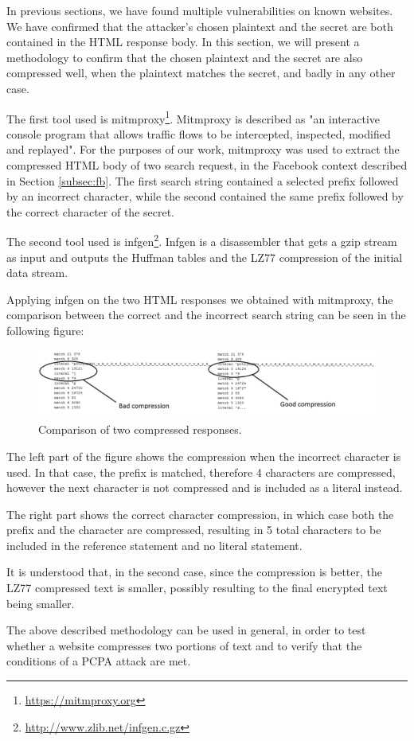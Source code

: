 In previous sections, we have found multiple vulnerabilities on known websites.
We have confirmed that the attacker's chosen plaintext and the secret are both
contained in the HTML response body. In this section, we will present a
methodology to confirm that the chosen plaintext and the secret are also
compressed well, when the plaintext matches the secret, and badly in any other
case.

The first tool used is mitmproxy\footnote{\url{https://mitmproxy.org}}.
Mitmproxy is described as "an interactive console program that allows traffic
flows to be intercepted, inspected, modified and replayed". For the purposes of
our work, mitmproxy was used to extract the compressed HTML body of two search
request, in the Facebook context described in Section \ref{subsec:fb}. The first
search string contained a selected prefix followed by an incorrect character,
while the second contained the same prefix followed by the correct character of
the secret.

The second tool used is infgen\footnote{\url{http://www.zlib.net/infgen.c.gz}}.
Infgen is a disassembler that gets a gzip stream as input and outputs the
Huffman tables and the LZ77 compression of the initial data stream.

Applying infgen on the two HTML responses we obtained with mitmproxy, the
comparison between the correct and the incorrect search string can be seen in
the following figure:

\begin{figure}[H] \caption{Comparison of two compressed responses.}
\includegraphics[width=1.15\textwidth]{diagrams/compression_comparison.png}\end{figure}

The left part of the figure shows the compression when the incorrect character
is used. In that case, the prefix is matched, therefore 4 characters are
compressed, however the next character is not compressed and is included as a
literal instead.

The right part shows the correct character compression, in which case both the
prefix and the character are compressed, resulting in 5 total characters to be
included in the reference statement and no literal statement.

It is understood that, in the second case, since the compression is better, the
LZ77 compressed text is smaller, possibly resulting to the final encrypted text
being smaller.

The above described methodology can be used in general, in order to test whether
a website compresses two portions of text and to verify that the conditions of a
PCPA attack are met.
